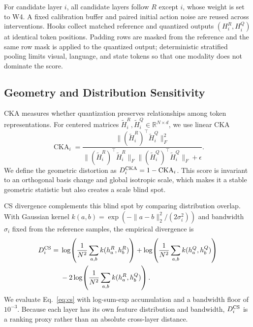 For candidate layer $i$, all candidate layers follow $R$ except $i$, whose weight is set to W4. A fixed calibration buffer and paired initial action noise are reused across interventions. Hooks collect matched reference and quantized outputs $(H_i^R,H_i^Q)$ at identical token positions. Padding rows are masked from the reference and the same row mask is applied to the quantized output; deterministic stratified pooling limits visual, language, and state tokens so that one modality does not dominate the score.

\subsection{Geometry and Distribution Sensitivity}
\label{sec:dual_scores}

CKA measures whether quantization preserves relationships among token representations. For centered matrices $\widetilde H_i^R,\widetilde H_i^Q\in\mathbb{R}^{N\times d}$, we use linear CKA
\begin{equation}
\operatorname{CKA}_i=
\frac{\|(\widetilde H_i^R)^{\!\top}\widetilde H_i^Q\|_F^2}
{\|(\widetilde H_i^R)^{\!\top}\widetilde H_i^R\|_F
 \|(\widetilde H_i^Q)^{\!\top}\widetilde H_i^Q\|_F+\epsilon}.
\label{eq:cka}
\end{equation}
We define the geometric distortion as $D^{\mathrm{CKA}}_i=1-\operatorname{CKA}_i$. This score is invariant to an orthogonal basis change and global isotropic scale, which makes it a stable geometric statistic but also creates a scale blind spot.

CS divergence complements this blind spot by comparing distribution overlap. With Gaussian kernel $k(a,b)=\exp(-\|a-b\|_2^2/(2\sigma_i^2))$ and bandwidth $\sigma_i$ fixed from the reference samples, the empirical divergence is
\begin{align}
D^{\mathrm{CS}}_i ={}& \log\!\left(\frac{1}{N^2}\sum_{a,b}k(h_a^R,h_b^R)\right)
+\log\!\left(\frac{1}{N^2}\sum_{a,b}k(h_a^Q,h_b^Q)\right) \nonumber\\
&-2\log\!\left(\frac{1}{N^2}\sum_{a,b}k(h_a^R,h_b^Q)\right).
\label{eq:cs}
\end{align}
We evaluate Eq.~\ref{eq:cs} with log-sum-exp accumulation and a bandwidth floor of $10^{-3}$. Because each layer has its own feature distribution and bandwidth, $D^{\mathrm{CS}}_i$ is a ranking proxy rather than an absolute cross-layer distance.

